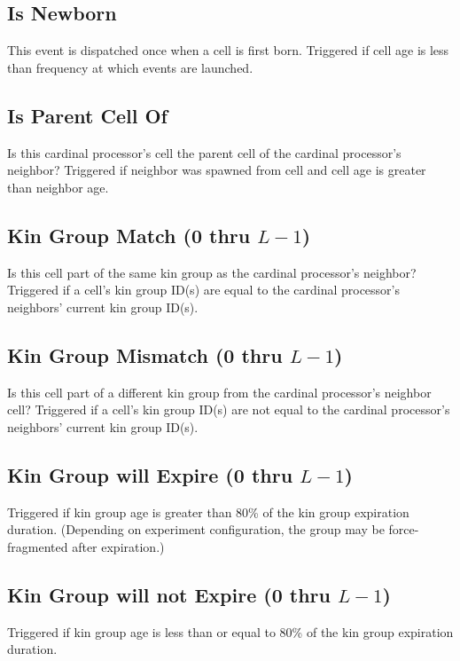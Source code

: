 \subsection{Is Newborn}

This event is dispatched once when a cell is first born.
Triggered if cell age is less than frequency at which events are launched.

\subsection{Is Parent Cell Of}

Is this cardinal processor's cell the parent cell of the cardinal processor's neighbor?
Triggered if neighbor was spawned from cell and cell age is greater than neighbor age.

\subsection{Kin Group Match (0 thru $L-1$)}

Is this cell part of the same kin group as the cardinal processor's neighbor?
Triggered if a cell's kin group ID(s) are equal to the cardinal processor's neighbors' current kin group ID(s).

\subsection{Kin Group Mismatch (0 thru $L-1$)}

Is this cell part of a different kin group from the cardinal processor's neighbor cell?
Triggered if a cell's kin group ID(s) are not equal to the cardinal processor's neighbors' current kin group ID(s).

\subsection{Kin Group will Expire (0 thru $L-1$)}

Triggered if kin group age is greater than 80\% of the kin group expiration duration.
(Depending on experiment configuration, the group may be force-fragmented after expiration.)

\subsection{Kin Group will not Expire (0 thru $L-1$)}

Triggered if kin group age is less than or equal to 80\% of the kin group expiration duration.

